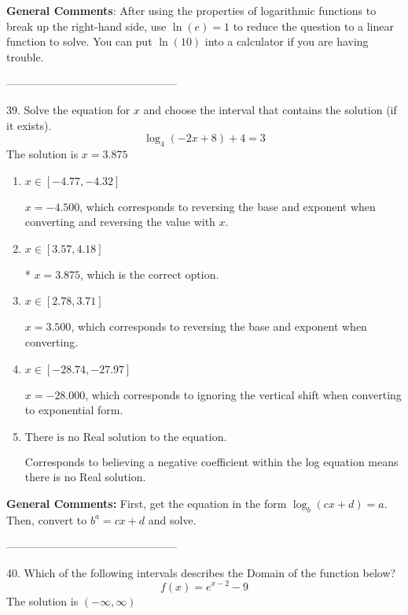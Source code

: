\documentclass{article}[14pt]
\begin{document}
\textbf{General Comments}: After using the properties of logarithmic functions to break up the right-hand side, use $\ln(e) = 1$ to reduce the question to a linear function to solve. You can put $\ln(10)$ into a calculator if you are having trouble.

-----------------------------------------------

39. Solve the equation for $x$ and choose the interval that contains the solution (if it exists).
$$ \log_{4}{(-2x+8)}+4 = 3 $$ 
The solution is $ x = 3.875 $ 

\begin{enumerate}[label=\Alph*.] 
\item $ x \in [-4.77, -4.32] $ 

 $x = -4.500$, which corresponds to reversing the base and exponent when converting and reversing the value with $x$. 
\item $ x \in [3.57, 4.18] $ 

 * $x = 3.875$, which is the correct option. 
\item $ x \in [2.78, 3.71] $ 

 $x = 3.500$, which corresponds to reversing the base and exponent when converting. 
\item $ x \in [-28.74, -27.97] $ 

 $x = -28.000$, which corresponds to ignoring the vertical shift when converting to exponential form. 
\item $ \text{There is no Real solution to the equation.} $ 

 Corresponds to believing a negative coefficient within the log equation means there is no Real solution. 
\end{enumerate} 
 
\textbf{General Comments:} First, get the equation in the form $\log_b{(cx+d)} = a$. Then, convert to $b^a = cx+d$ and solve.

-----------------------------------------------

40. Which of the following intervals describes the Domain of the function below?
$$ f(x) = e^{x-2}-9 $$ 
The solution is $ (-\infty, \infty) $ 
\end{document}
